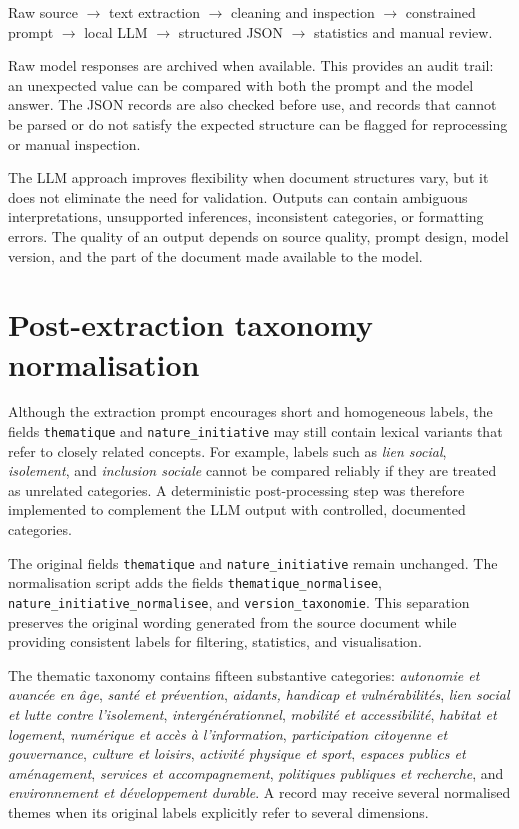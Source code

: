 \begin{center}
Raw source $\rightarrow$ text extraction $\rightarrow$ cleaning and inspection
$\rightarrow$ constrained prompt $\rightarrow$ local LLM $\rightarrow$
structured JSON $\rightarrow$ statistics and manual review.
\end{center}

Raw model responses are archived when available. This provides an audit trail:
an unexpected value can be compared with both the prompt and the model answer.
The JSON records are also checked before use, and records that cannot be parsed
or do not satisfy the expected structure can be flagged for reprocessing or
manual inspection.

The LLM approach improves flexibility when document structures vary, but it
does not eliminate the need for validation. Outputs can contain ambiguous
interpretations, unsupported inferences, inconsistent categories, or formatting
errors. The quality of an output depends on source quality, prompt design, model
version, and the part of the document made available to the model.

\section{Post-extraction taxonomy normalisation}

Although the extraction prompt encourages short and homogeneous labels, the
fields \texttt{thematique} and \texttt{nature\_initiative} may still contain
lexical variants that refer to closely related concepts. For example, labels
such as \textit{lien social}, \textit{isolement}, and \textit{inclusion sociale}
cannot be compared reliably if they are treated as unrelated categories. A
deterministic post-processing step was therefore implemented to complement the
LLM output with controlled, documented categories.

The original fields \texttt{thematique} and \texttt{nature\_initiative} remain
unchanged. The normalisation script adds the fields
\texttt{thematique\_normalisee},
\texttt{nature\_initiative\_normalisee}, and
\texttt{version\_taxonomie}. This separation preserves the original wording
generated from the source document while providing consistent labels for
filtering, statistics, and visualisation.

The thematic taxonomy contains fifteen substantive categories:
\textit{autonomie et avancée en âge}, \textit{santé et prévention},
\textit{aidants, handicap et vulnérabilités}, \textit{lien social et lutte
contre l'isolement}, \textit{intergénérationnel}, \textit{mobilité et
accessibilité}, \textit{habitat et logement}, \textit{numérique et accès à
l'information}, \textit{participation citoyenne et gouvernance},
\textit{culture et loisirs}, \textit{activité physique et sport},
\textit{espaces publics et aménagement}, \textit{services et
accompagnement}, \textit{politiques publiques et recherche}, and
\textit{environnement et développement durable}. A record may receive several
normalised themes when its original labels explicitly refer to several
dimensions.

